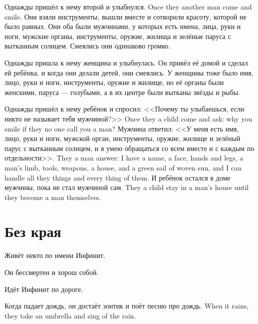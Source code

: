 {Однажды пришёл к нему второй и улыбнулся.}
{Once they another man come and smile.}
Они взяли инструменты, вышли вместе и сотворили красоту, которой не было равных.
Они оба были мужчинами, у которых есть имена, лица, руки и ноги, мужские органы, инструменты, оружие, жилища и зелёные паруса с вытканным солнцем.
Смеялись они одинаково громко.

Однажды пришла к нему женщина и улыбнулась.
Он привёл её домой и сделал ей ребёнка, и когда они делали детей, они смеялись.
У женщины тоже было имя, лицо, руки и ноги, инструменты, оружие и жилище, но её органы были женскими, паруса --- голубыми, а в их центре были вытканы звёзды и рыбы.

{Однажды пришёл к нему ребёнок и спросил: <<Почему ты улыбаешься, если никто не называет тебя мужчиной?>>}
{Once they a child come and ask: why you smile if they no one call you a man?}
{Мужчина ответил: <<У меня есть имя, лицо, руки и ноги, мужской орган, инструменты, оружие, жилище и зелёный парус с вытканным солнцем, и я умею обращаться со всем вместе и с каждым по отдельности>>.}
{They a man answer: I have a name, a face, hands and legs, a man's limb, tools, weapons, a house, and a green sail of woven sun, and I can handle all they things and every thing of them.}
{И ребёнок остался в доме мужчины, пока не стал мужчиной сам.}
{They a child stay in a man's house until they become a man themselves.}

\section*{Без края}

Живёт некто по имени Инфинит\FM.

Он бессмертен и хорош собой.

Идёт Инфинит по дороге.

{Когда падает дождь, он достаёт зонтик и поёт песню про дождь.}
{When it rains, they take an umbrella and sing of the rain.}

